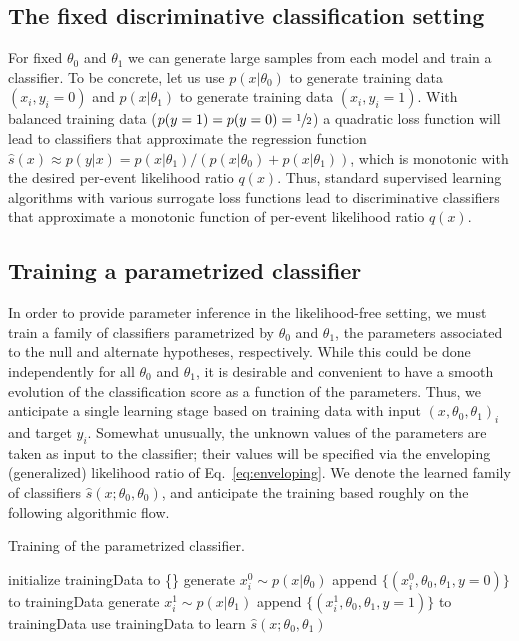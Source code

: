 \documentclass[aoas,preprint]{imsart}
\numberwithin{equation}{section}
\theoremstyle{plain}
\begin{document}
\subsection{The fixed discriminative classification setting} 
For fixed $\theta_0$ and $\theta_1$ we can generate 
large samples from each model and train a classifier. To be concrete, let us use $p(x|\theta_0)$ to generate training 
data $(x_i,  y_i=0)$ and $p(x|\theta_1)$ to generate training data $(x_i , y_i=1)$. With balanced training data   \mbox{($p(y=1)=p(y=0)=\sfrac{1}{2}$)} a quadratic loss function will lead to classifiers that approximate the regression function  $\hat{s}(x) \approx p(y|x) = p(x|\theta_1)/(p(x|\theta_0)+p(x|\theta_1))$, which is  monotonic with the desired per-event likelihood ratio $q(x)$. Thus, standard supervised learning algorithms with various surrogate loss functions lead to discriminative classifiers that approximate a monotonic function of per-event likelihood ratio $q(x)$.  


\subsection{Training a parametrized classifier}

In order to provide parameter inference in the likelihood-free setting, we must train a family of  classifiers parametrized by $\theta_0$ and $\theta_1$, the 
parameters associated to the null and alternate hypotheses, respectively. While this could be done independently
for all $\theta_0$ and $\theta_1$, it is desirable and convenient to have a smooth evolution of the classification score as a function of the parameters. Thus, we anticipate a single learning stage based on training data with input $(x, \theta_0, \theta_1)_i$ and target $y_i$. Somewhat unusually, the unknown values of the parameters are taken
as input to the classifier; their values will be specified via the enveloping (generalized) likelihood ratio of Eq.~\ref{eq:enveloping}. We denote the learned family of classifiers $\hat{s}(x; \theta_0, \theta_0)$, and anticipate the training based roughly on the following algorithmic flow.
\begin{algorithm}[ht]
\caption{Training of the parametrized classifier.}\label{alg:training}
\begin{algorithmic}
\STATE initialize trainingData to \{\}
		\STATE generate $x_i^0 \sim p(x|\theta_0)$
		\STATE append $\{ (x_i^0, \theta_0, \theta_1, y=0) \}$ to trainingData
		\STATE generate $x_i^1 \sim p(x|\theta_1)$
		\STATE append $\{ (x_i^1, \theta_0, \theta_1, y=1) \}$ to trainingData
	\ENDFOR
\ENDFOR
\STATE use trainingData to learn $\hat{s}(x; \theta_0, \theta_1)$
\end{algorithmic}
\end{algorithm}%
\end{document}
